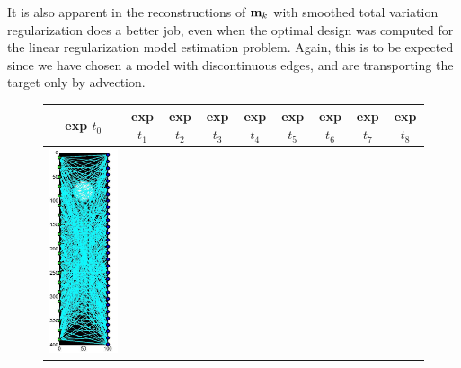 \documentclass[11pt]{article}
\newcommand{\bfm}	{{\bf{m}}}
\begin{document}
It is also apparent in the reconstructions of $\bfm_k$ with smoothed total variation regularization does a better job, even when the optimal design was computed for the linear regularization model estimation problem. Again, this is to be expected since we have chosen a model with discontinuous edges, and are transporting the target only by advection. 
\begin{figure}[!h]
	\renewcommand{\arraystretch}{1.5}
	\begin{center}
		\iwidth=13mm
		\begin{tabular}{|c|c|c|c|c|c|c|c|c|}
			\hline		
			 exp $t_0$ & exp $t_1$ & exp $t_2$& exp $t_3$& exp $t_4$& exp $t_5$& exp $t_6$ & exp $t_7$ & exp $t_8$\\
			\hline		
			\includegraphics[width=.9\iwidth]{figures/newFigs/resultsExp-1-designs}

\end{tabular}
\end{center}
\end{figure}
\end{document}

